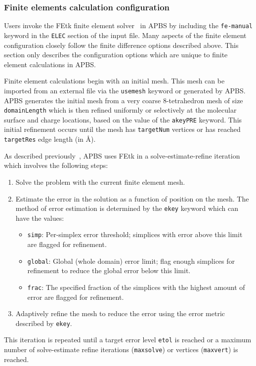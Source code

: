 \documentclass[12pt,titlepage]{article}
\newcommand{\keyword}[1]{\texttt{#1}}
\begin{document}
\subsubsection{Finite elements calculation configuration}
Users invoke the FEtk finite element solver~\cite{FEtk} in APBS by including the \keyword{fe-manual} keyword in the \keyword{ELEC} section of the input file.
Many aspects of the finite element configuration closely follow the finite difference options described above.
This section only describes the configuration options which are unique to finite element calculations in APBS.

Finite element calculations begin with an initial mesh.
This mesh can be imported from an external file via the \keyword{usemesh} keyword or generated by APBS.
APBS generates the initial mesh from a very coarse 8-tetrahedron mesh of size \keyword{domainLength} which is then refined uniformly or selectively at the molecular surface and charge locations, based on the value of the \keyword{akeyPRE} keyword.  
This initial refinement occurs until the mesh has \keyword{targetNum} vertices or has reached \keyword{targetRes} edge length (in \AA).

As described previously~\cite{Holst2000, Baker2000}, APBS uses FEtk in a solve-estimate-refine iteration which involves the following steps:
\begin{enumerate}
	\item Solve the problem with the current finite element mesh.
	\item Estimate the error in the solution as a function of position on the mesh.
	The method of error estimation is determined by the \keyword{ekey} keyword which can have the values:
	\begin{itemize}
		\item \keyword{simp}: Per-simplex error threshold; simplices with error above this limit are flagged for refinement.
		\item \keyword{global}: Global (whole domain) error limit; flag enough simplices for refinement to reduce the global error below this limit.
		\item \keyword{frac}: The specified fraction of the simplices with the highest amount of error are flagged for refinement.
	\end{itemize}
	\item Adaptively refine the mesh to reduce the error using the error metric described by \keyword{ekey}.
\end{enumerate}
This iteration is repeated until a target error level \keyword{etol} is reached or a maximum number of solve-estimate refine iterations (\keyword{maxsolve}) or vertices (\keyword{maxvert}) is reached.
\end{document}
